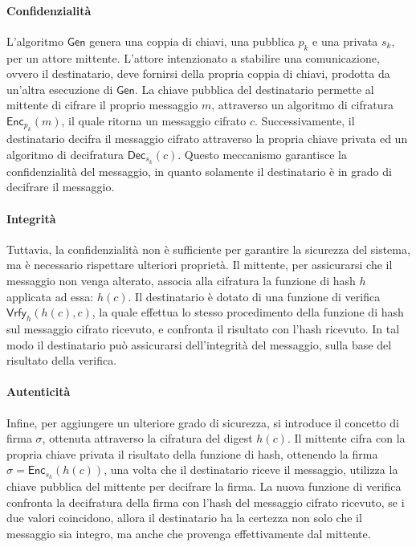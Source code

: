 \documentclass[a4paper,12pt]{article}
\begin{document}
\paragraph{Confidenzialità} 
L'algoritmo $\mathsf{Gen}$ genera una coppia di chiavi, una pubblica $p_k$ e una privata $s_k$, per un attore mittente. L'attore intenzionato a stabilire una comunicazione, ovvero il destinatario, deve fornirsi della propria coppia di chiavi, prodotta da un'altra esecuzione di $\mathsf{Gen}$. 
La chiave pubblica del destinatario permette al mittente di cifrare il proprio messaggio $m$, attraverso un algoritmo di cifratura $\mathsf{Enc}_{p_k}(m)$, il quale ritorna un messaggio cifrato $c$. Successivamente, il destinatario decifra il messaggio cifrato attraverso la propria chiave privata ed un algoritmo di decifratura $\mathsf{Dec}_{s_k}(c)$.
Questo meccanismo garantisce la confidenzialità del messaggio, in quanto solamente il destinatario è in grado di decifrare il messaggio.
\paragraph{Integrità}
Tuttavia, la confidenzialità non è sufficiente per garantire la sicurezza del sistema, ma è necessario rispettare ulteriori proprietà.
Il mittente, per assicurarsi che il messaggio non venga alterato, associa alla cifratura la funzione di hash $h$ applicata ad essa: $h(c)$. Il destinatario è dotato di una funzione di verifica $\mathsf{Vrfy}_{h}(h(c),c)$, la quale effettua lo stesso procedimento della funzione di hash sul messaggio cifrato ricevuto, e confronta il risultato con l'hash ricevuto. In tal modo il destinatario può assicurarsi dell'integrità del messaggio, sulla base del risultato della verifica.  
\paragraph{Autenticità}
Infine, per aggiungere un ulteriore grado di sicurezza, si introduce il concetto di firma $\sigma$, ottenuta attraverso la cifratura del digest $h(c)$. 
Il mittente cifra con la propria chiave privata il risultato della funzione di hash, ottenendo la firma $\sigma=\mathsf{Enc}_{s_k}(h(c))$, una volta che il destinatario riceve il messaggio, utilizza la chiave pubblica del mittente per decifrare la firma. La nuova funzione di verifica confronta la decifratura della firma con l'hash del messaggio cifrato ricevuto, se i due valori coincidono, allora il destinatario ha la certezza non solo che il messaggio sia integro, ma anche che provenga effettivamente dal mittente.
\end{document}
